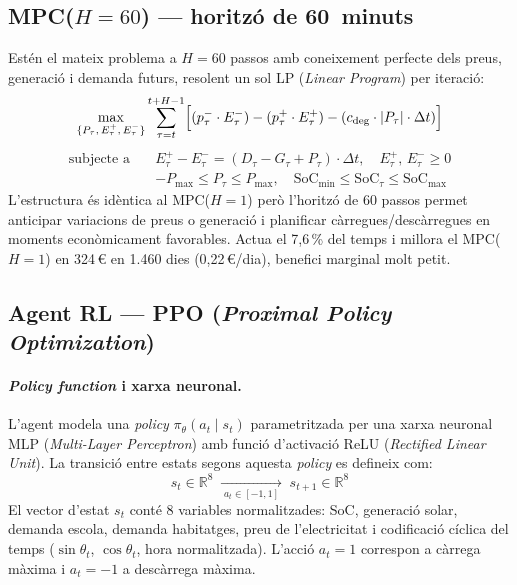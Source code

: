 \documentclass[a4paper,11pt]{article}
\begin{document}
\subsection*{MPC($H=60$) — horitzó de 60~minuts}

Estén el mateix problema a $H=60$ passos amb coneixement perfecte dels
preus, generació i demanda futurs, resolent un sol
LP (\textit{Linear Program}) per iteració:
\begin{equation}
  \max_{\{P_\tau,\,E^+_\tau,\,E^-_\tau\}}
  \sum_{\tau=t}^{t+H-1}
  \Bigl[(p^-_\tau \cdot E^-_\tau) - (p^+_\tau \cdot E^+_\tau)
        - (c_{\mathrm{deg}} \cdot |P_\tau| \cdot \Delta t)\Bigr]
\end{equation}
\begin{align*}
  \text{subjecte a}\quad
  & E^+_\tau - E^-_\tau = (D_\tau - G_\tau + P_\tau) \cdot \Delta t,
    \quad E^+_\tau,\,E^-_\tau \geq 0\\
  & -P_{\max} \leq P_\tau \leq P_{\max},\quad
    \mathrm{SoC}_{\min} \leq \mathrm{SoC}_\tau \leq \mathrm{SoC}_{\max}
\end{align*}
L'estructura és idèntica al MPC($H=1$) però l'horitzó de 60 passos permet
anticipar variacions de preus o generació i planificar càrregues/descàrregues
en moments econòmicament favorables.
Actua el 7,6\,\% del temps i millora el MPC($H=1$) en
324\,€ en 1.460 dies (0,22\,€/dia), benefici marginal molt petit.

\subsection*{Agent RL — PPO (\textit{Proximal Policy Optimization})}

\paragraph{\textit{Policy function} i xarxa neuronal.}
L'agent modela una \textit{policy} $\pi_\theta(a_t\mid s_t)$ parametritzada
per una xarxa neuronal MLP (\textit{Multi-Layer Perceptron}) amb funció
d'activació ReLU (\textit{Rectified Linear Unit}).
La transició entre estats segons aquesta \textit{policy} es defineix com:
\begin{equation}
  s_t\in\mathbb{R}^8
  \;\xrightarrow[{\;a_t\in[-1,1]\;}]{\;}\;
  s_{t+1}\in\mathbb{R}^8
\end{equation}
El vector d'estat $s_t$ conté 8 variables normalitzades: SoC, generació solar,
demanda escola, demanda habitatges, preu de l'electricitat i codificació cíclica
del temps ($\sin\theta_t$, $\cos\theta_t$, hora normalitzada).
L'acció $a_t=1$ correspon a càrrega màxima i $a_t=-1$ a descàrrega màxima.
\end{document}
